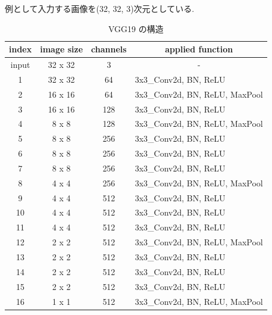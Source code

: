 \begin{table}[t]
  \begin{center}
    \caption{VGG19 の構造}
		\vspace{-1mm}
    例として入力する画像を(32, 32, 3)次元としている.
		\vspace{1mm}
		\vspace{3mm}
    \begin{tabular}{|c|c|c|l|}
    \hline
    \textbf{index} & \textbf{image size} & \textbf{channels} & \multicolumn{1}{c|}{\textbf{applied function}} \\ \hline
    input & 32 x 32 & 3   & \multicolumn{1}{c|}{-}         \\ \hline
    1     & 32 x 32 & 64  & 3x3\_Conv2d, BN, ReLU          \\ \hline
    2     & 16 x 16 & 64  & 3x3\_Conv2d, BN, ReLU, MaxPool \\ \hline
    3     & 16 x 16 & 128 & 3x3\_Conv2d, BN, ReLU          \\ \hline
    4     & 8 x 8   & 128 & 3x3\_Conv2d, BN, ReLU, MaxPool \\ \hline
    5     & 8 x 8   & 256 & 3x3\_Conv2d, BN, ReLU          \\ \hline
    6     & 8 x 8   & 256 & 3x3\_Conv2d, BN, ReLU          \\ \hline
    7     & 8 x 8   & 256 & 3x3\_Conv2d, BN, ReLU          \\ \hline
    8     & 4 x 4   & 256 & 3x3\_Conv2d, BN, ReLU, MaxPool \\ \hline
    9     & 4 x 4   & 512 & 3x3\_Conv2d, BN, ReLU          \\ \hline
    10    & 4 x 4   & 512 & 3x3\_Conv2d, BN, ReLU          \\ \hline
    11    & 4 x 4   & 512 & 3x3\_Conv2d, BN, ReLU          \\ \hline
    12    & 2 x 2   & 512 & 3x3\_Conv2d, BN, ReLU, MaxPool \\ \hline
    13    & 2 x 2   & 512 & 3x3\_Conv2d, BN, ReLU          \\ \hline
    14    & 2 x 2   & 512 & 3x3\_Conv2d, BN, ReLU          \\ \hline
    15    & 2 x 2   & 512 & 3x3\_Conv2d, BN, ReLU          \\ \hline
    16    & 1 x 1   & 512 & 3x3\_Conv2d, BN, ReLU, MaxPool \\ \hline
    \end{tabular}
    \label{tab:vgg}
  \end{center}
\end{table}


